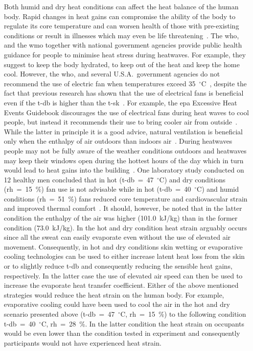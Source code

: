 Both humid and dry heat conditions can affect the heat balance of the human body.
Rapid changes in heat gains can compromise the ability of the body to regulate its core temperature and can worsen health of those with pre-existing conditions or result in illnesses which may even be life threatening~\cite{WMO2015}.
The \ac{who}, and the \ac{wmo} together with national government agencies provide public health guidance for people to minimise heat stress during heatwaves.
For example, they suggest to keep the body hydrated, to keep out of the heat and keep the home cool.
However, the \ac{who}, and several U.S.A.\ government agencies do not recommend the use of electric fan when temperatures exceed 35~$^{\circ}$C~\cite{ExtremeH66:online, Frequent18:online, HeatandH28:online, WMO2015}, despite the fact that previous research has shown that the use of electrical fans is beneficial even if the \ac{t-db} is higher than the \ac{t-sk}~\cite{Rate2015, Jay2015, Jay2019a, Rate2015}.
For example, the \ac{epa} Excessive Heat Events Guidebook discourages the use of electrical fans during heat waves to cool people, but instead it recommends their use to bring cooler air from outside~\cite{UnitedStatesEnvironmentalProtectionAgency2006}.
While the latter in principle it is a good advice, natural ventilation is beneficial only when the enthalpy of air outdoors than indoors air~\cite{Fiorentini2019}\@.
During heatwaves people may not be fully aware of the weather conditions outdoors and heatwaves may keep their windows open during the hottest hours of the day which in turn would lead to heat gains into the building~\cite{Tartarini2017}.
One laboratory study conducted on 12 healthy men concluded that in hot (\ac{t-db}~=~47~$^{\circ}$C) and dry conditions (\ac{rh}~=~15~\%) fan use is not advisable while in hot (\ac{t-db}~=~40~$^{\circ}$C) and humid conditions (\ac{rh}~=~51~\%) fans reduced core temperature and cardiovascular strain and improved thermal comfort~\cite{Morris2019}.
It should, however, be noted that in the latter condition the enthalpy of the air was higher (101.0~kJ/kg) than in the former condition (73.0~kJ/kg).
In the hot and dry condition heat strain arguably occurs since all the sweat can easily evaporate even without the use of elevated air movement.
Consequently, in hot and dry conditions skin wetting or evaporative cooling technologies can be used to either increase latent heat loss from the skin or to slightly reduce \ac{t-db} and consequently reducing the sensible heat gains, respectively.
In the latter case the use of elevated air speed can then be used to increase the evaporate heat transfer coefficient.
Either of the above mentioned strategies would reduce the heat strain on the human body.
For example, evaporative cooling could have been used to cool the air in the hot and dry scenario presented above (\ac{t-db}~=~47~$^{\circ}$C, \ac{rh}~=~15~\%) to the following condition \ac{t-db}~=~40~$^{\circ}$C, \ac{rh}~=~28~\%\@.
In the latter condition the heat strain on occupants would be even lower than the condition tested in  experiment and consequently participants would not have experienced heat strain.

